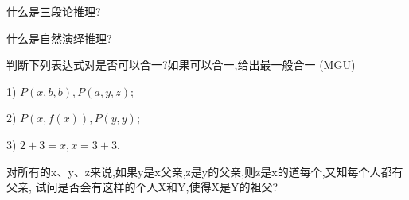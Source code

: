 \begin{think}
 什么是三段论推理?
\end{think}

\begin{think}
  什么是自然演绎推理?
\end{think}

\begin{think}
判断下列表达式对是否可以合一?如果可以合一,给出最一般合一 (MGU)

1) $P(x,b,b), P(a, y, z)$;

2) $P(x,f(x)),P(y,y)$;

3) $2+3=x,x=3+3$.
\end{think}

\begin{think}
  对所有的x、y、z来说,如果y是x父亲,z是y的父亲,则z是x的道每个,又知每个人都有父亲, 试问是否会有这样的个人X和Y,使得X是Y的祖父?
\end{think}
